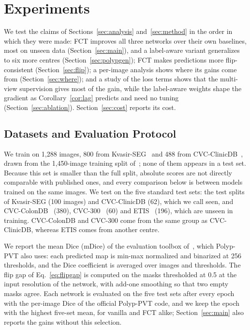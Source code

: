 \section{Experiments}
\label{sec:experiments}

We test the claims of Sections~\ref{sec:analysis} and~\ref{sec:method} in the order in which they were
made: FCT improves all three networks over their own baselines, most on
unseen data (Section~\ref{sec:main}), and a label-aware variant generalizes to six more centres
(Section~\ref{sec:polypgen}); FCT makes predictions more flip-consistent
(Section~\ref{sec:flip}); a per-image analysis shows where its gains come from
(Section~\ref{sec:where}); and a study of the loss terms shows that the multi-view supervision gives
most of the gain, while the label-aware weights shape the gradient as Corollary~\ref{cor:lag} predicts and
need no tuning (Section~\ref{sec:ablation}).
Section~\ref{sec:cost} reports its cost.

\subsection{Datasets and Evaluation Protocol}
\label{sec:setup}

We train on 1,288 images, 800 from Kvasir-SEG~\cite{jha2020kvasir} and 488 from
CVC-ClinicDB~\cite{bernal2015clinicdb}, drawn from the 1,450-image training split
of~\cite{fan2020pranet}; none of them appears in a test set. Because this set is smaller than the full
split, absolute scores are not directly comparable with published ones, and every comparison below is
between models trained on the same images. We test on the five standard test sets: the test splits of
Kvasir-SEG (100 images) and CVC-ClinicDB (62), which we call seen, and
CVC-ColonDB~\cite{tajbakhsh2016colondb} (380), CVC-300~\cite{vazquez2017endoscene} (60) and
ETIS~\cite{silva2014etis} (196), which are unseen in training. CVC-ColonDB and CVC-300 come from the same
group as CVC-ClinicDB, whereas ETIS comes from another centre.

We report the mean Dice (mDice) of the evaluation toolbox of~\cite{fan2020pranet}, which Polyp-PVT also
uses: each predicted map is min-max normalized and binarized at 256 thresholds, and the Dice coefficient
is averaged over images and thresholds. The flip gap of Eq.~\eqref{eq:flipgap} is computed on the masks
thresholded at 0.5 at the input resolution of the network, with add-one smoothing so that two empty
masks agree. Each network is evaluated on the five test sets after every epoch with the per-image Dice
of the official Polyp-PVT code, and we keep the epoch with the highest five-set mean, for vanilla and
FCT alike; Section~\ref{sec:main} also reports the gains without this selection.

